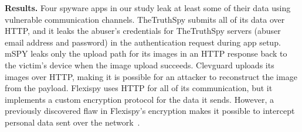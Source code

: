 \documentclass[sigconf,balance=false]{acmart}
\newcommand{\sumanth}[1]{\textcolor{violet}{\noindent[SR: #1]}}
\newcommand{\damon}[1]{\textcolor{blue}{\noindent[DM: #1]}}
\newcommand{\geoff}[1]{\textcolor{purple}{\noindent[GV: #1]}}
\newcommand{\sumanth}[1]{}
\newcommand{\geoff}[1]{}
\newcommand{\damon}[1]{}
\begin{document}


\textbf{Results.}  Four spyware apps in our study leak at least some
of their data using vulnerable communication channels.  TheTruthSpy
submits all of its data over HTTP, and it leaks the abuser's
credentials for TheTruthSpy servers (abuser email address and
password) in the authentication request during app setup.
mSPY leaks only
the upload path for its images in an HTTP response back to the
victim's device when the image upload succeeds.
Clevguard uploads its images over HTTP, making it is possible for an attacker to reconstruct the image from the payload.  Flexispy uses
HTTP for all of its communication, but it implements a custom
encryption protocol for the data it sends.  However, a previously
discovered flaw in Flexispy's encryption makes it possible to
intercept personal data sent over the
network~\cite{Stalking85:online}.

\end{document}
